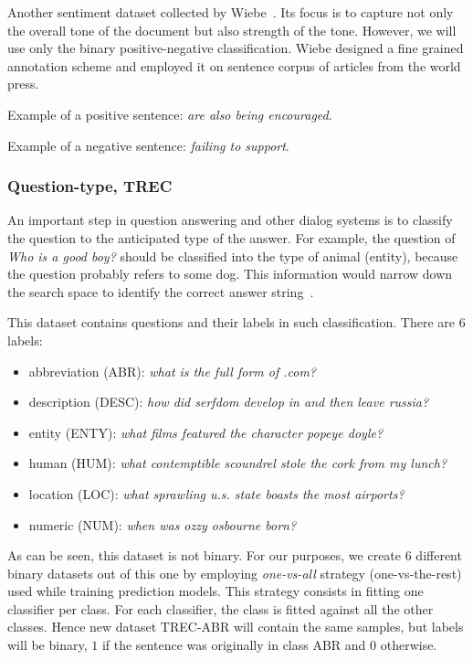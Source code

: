     Another sentiment dataset collected by Wiebe~\cite{wiebe2005annotating}.
    Its focus is to capture not only the overall tone of the document but also strength of the tone.
    However, we will use only the binary positive-negative classification.
    Wiebe designed a fine grained annotation scheme and employed it on sentence corpus of articles from the world press.
    
    Example of a positive sentence:
    \emph{are also being encouraged}.
    
    Example of a negative sentence:
    \emph{failing to support}. 

    
    \subsubsection{Question-type, TREC}\label{sec:TREC}
    
    An important step in question answering and other dialog systems is to classify the question to the anticipated type of the answer. 
    For example, the question of \emph{Who is a good boy?} should be classified into the type of animal (entity), because the question probably refers to some dog.  
    This information would narrow down the search space to identify the correct answer string~\cite{huang2008question}. 
    
    This dataset contains questions and their labels in such classification.
    There are $6$ labels: 
    
    \begin{itemize}
        \item abbreviation (ABR): \emph{what is the full form of .com?}
        \item description (DESC): \emph{how did serfdom develop in and then leave russia?}
        \item entity (ENTY): \emph{what films featured the character popeye doyle?}
        \item human (HUM): \emph{what contemptible scoundrel stole the cork from my lunch?}
        \item location (LOC): \emph{what sprawling u.s. state boasts the most airports?}
        \item numeric (NUM): \emph{when was ozzy osbourne born?}
    \end{itemize}
    
    As can be seen, this dataset is not binary. 
    For our purposes, we create $6$ different binary datasets out of this one by employing \emph{one-vs-all} strategy (one-vs-the-rest) used while training prediction models.
    This strategy consists in fitting one classifier per class. 
    For each classifier, the class is fitted against all the other classes. 
    Hence new dataset TREC-ABR will contain the same samples, but labels will be binary, $1$ if the sentence was originally in class ABR and $0$ otherwise.
    
